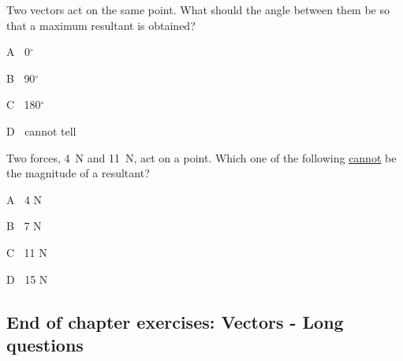 \begin{enumerate}
\begin{minipage}{\textwidth}
\item Two vectors act on the same point. What should the angle between them be so that a maximum resultant is obtained?
\begin{multicols}{4} 
\item[A] $\;\;$0$^\circ$
\item[B] $\;\;$90$^\circ$
\item[C] $\;\;$180$^\circ$
\item[D] $\;\;$cannot tell\\
\end{multicols}
\end{minipage}

\begin{minipage}{\textwidth}
\item Two forces, 4~N and 11~N, act on a point. Which one of the following \underline{cannot} be the magnitude of a resultant?
\begin{multicols}{4} 
\item[A] $\;\;$4 N
\item[B] $\;\;$7 N
\item[C] $\;\;$11 N
\item[D] $\;\;$15 N
\end{multicols}
\end{minipage}

\end{enumerate}

\subsection{End of chapter exercises: Vectors - Long questions}


